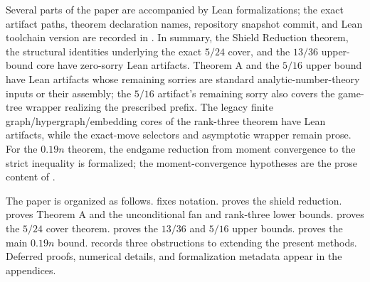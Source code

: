 Several parts of the paper are accompanied by Lean formalizations; the exact
artifact paths, theorem declaration names, repository snapshot commit, and Lean
toolchain version are recorded in .  In summary, the
Shield Reduction theorem, the structural identities underlying the exact
$5/24$ cover, and the $13/36$ upper-bound core have zero-sorry Lean artifacts.
Theorem A and the $5/16$ upper bound have Lean artifacts whose remaining
sorries are standard analytic-number-theory inputs or their assembly; the
$5/16$ artifact's remaining sorry also covers the game-tree wrapper realizing
the prescribed prefix.  The legacy finite graph/hypergraph/embedding cores of
the rank-three theorem have Lean artifacts, while the exact-move selectors and
asymptotic wrapper remain prose.  For the $0.19n$ theorem, the
endgame reduction from moment convergence to the strict inequality is
formalized; the moment-convergence hypotheses are the prose content of
.

The paper is organized as follows.   fixes notation.
 proves the shield reduction.   proves
Theorem A and the unconditional fan and rank-three lower bounds.
 proves the $5/24$ cover theorem.
 proves the $13/36$ and $5/16$ upper bounds.
 proves the main $0.19n$ bound.  
records three obstructions to extending the present methods.  Deferred proofs,
numerical details, and formalization metadata appear in the appendices.
